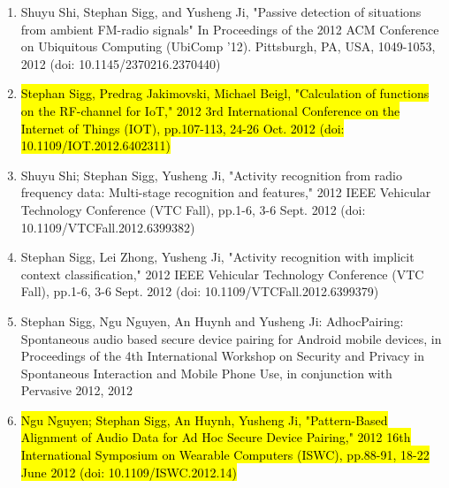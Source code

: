 \documentclass[10pt]{article}
\newcounter{saveenumi}
\begin{document}
\begin{enumerate}
\item Shuyu Shi, Stephan Sigg, and Yusheng Ji, "Passive detection of situations from ambient FM-radio signals" In Proceedings of the 2012 ACM Conference on Ubiquitous Computing (UbiComp '12). Pittsburgh, PA, USA, 1049-1053, 2012 (doi: 10.1145/2370216.2370440) 
\item \hl{Stephan Sigg, Predrag Jakimovski, Michael Beigl, "Calculation of functions on the RF-channel for IoT," 2012 3rd International Conference on the Internet of Things (IOT), pp.107-113, 24-26 Oct. 2012 (doi: 10.1109/IOT.2012.6402311)}
\item Shuyu Shi; Stephan Sigg, Yusheng Ji, "Activity recognition from radio frequency data: Multi-stage recognition and features," 2012 IEEE Vehicular Technology Conference (VTC Fall), pp.1-6, 3-6 Sept. 2012 (doi: 10.1109/VTCFall.2012.6399382)
\item Stephan Sigg, Lei Zhong, Yusheng Ji, "Activity recognition with implicit context classification," 2012 IEEE Vehicular Technology Conference (VTC Fall), pp.1-6, 3-6 Sept. 2012 (doi: 10.1109/VTCFall.2012.6399379)
\item Stephan Sigg, Ngu Nguyen, An Huynh and Yusheng Ji: AdhocPairing: Spontaneous audio based secure device pairing for Android mobile devices, in Proceedings of the 4th International Workshop on Security and Privacy in Spontaneous Interaction and Mobile Phone Use, in conjunction with Pervasive 2012, 2012
\item \hl{Ngu Nguyen; Stephan Sigg, An Huynh, Yusheng Ji, "Pattern-Based Alignment of Audio Data for Ad Hoc Secure Device Pairing," 2012 16th International Symposium on Wearable Computers (ISWC), pp.88-91, 18-22 June 2012 (doi: 10.1109/ISWC.2012.14)}
\setcounter{saveenumi}{\value{enumi}}
\end{enumerate}
\end{document}
